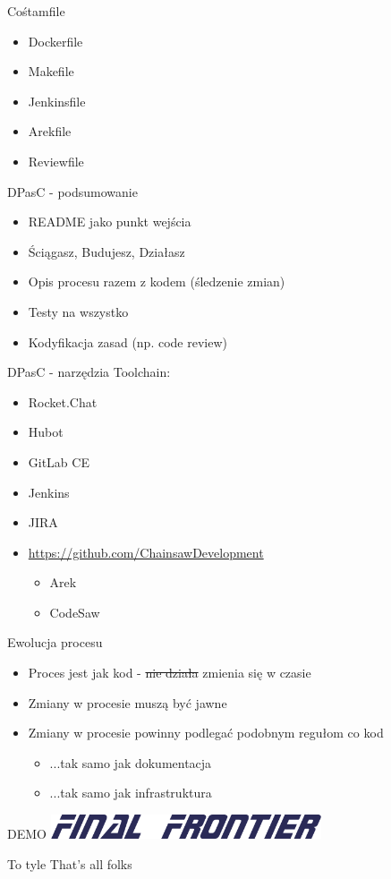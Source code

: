 \documentclass[ignorenonframetext]{beamer}
\begin{document}
\begin{frame}{Cośtamfile}
\begin{itemize}
	\item Dockerfile
	\item Makefile
	\item Jenkinsfile
	\item Arekfile
	\item Reviewfile
\end{itemize}
\end{frame}

\begin{frame}{DPasC - podsumowanie}
\begin{itemize}
	\item README jako punkt wejścia
	\item Ściągasz, Budujesz, Działasz	
	\item Opis procesu razem z kodem (śledzenie zmian)
	\item Testy na wszystko
	\item Kodyfikacja zasad (np. code review)
\end{itemize}
\end{frame}

\begin{frame}{DPasC - narzędzia}
Toolchain:
\begin{itemize}
	\item Rocket.Chat
	\item Hubot
	\item GitLab CE
	\item Jenkins
	\item JIRA
	\item \url{https://github.com/ChainsawDevelopment}
	\begin{itemize}
		\item Arek
		\item CodeSaw
	\end{itemize}
\end{itemize}

\end{frame}

\begin{frame}{Ewolucja procesu}
\begin{itemize}
	\item Proces jest jak kod - \sout{nie działa} zmienia się w czasie
	\item Zmiany w procesie muszą być jawne
	\item Zmiany w procesie powinny podlegać podobnym regułom co kod
		\begin{itemize}
			\item ...tak samo jak dokumentacja
			\item ...tak samo jak infrastruktura
		\end{itemize}
\end{itemize}
\end{frame}

\begin{frame}{DEMO}
	\centering
	\includegraphics[width=8cm]{images/final-frontier.png}
\end{frame}

\begin{frame}{To tyle}
	That's all folks
\end{frame}
\end{document}
